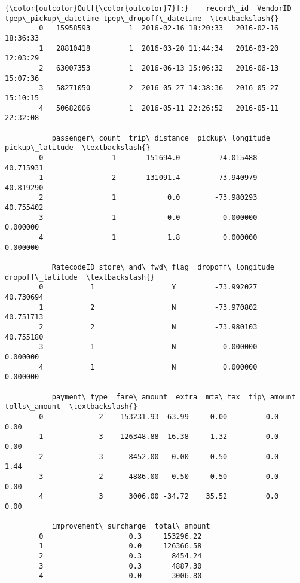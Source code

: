 \documentclass[11pt]{article}
\begin{document}
\begin{Verbatim}[commandchars=\\\{\}]
{\color{outcolor}Out[{\color{outcolor}7}]:}    record\_id  VendorID tpep\_pickup\_datetime tpep\_dropoff\_datetime  \textbackslash{}
        0   15958593         1  2016-02-16 18:20:33   2016-02-16 18:36:33   
        1   28810418         1  2016-03-20 11:44:34   2016-03-20 12:03:29   
        2   63007353         1  2016-06-13 15:06:32   2016-06-13 15:07:36   
        3   58271050         2  2016-05-27 14:38:36   2016-05-27 15:10:15   
        4   50682006         1  2016-05-11 22:26:52   2016-05-11 22:32:08   
        
           passenger\_count  trip\_distance  pickup\_longitude  pickup\_latitude  \textbackslash{}
        0                1       151694.0        -74.015488        40.715931   
        1                2       131091.4        -73.940979        40.819290   
        2                1            0.0        -73.980293        40.755402   
        3                1            0.0          0.000000         0.000000   
        4                1            1.8          0.000000         0.000000   
        
           RatecodeID store\_and\_fwd\_flag  dropoff\_longitude  dropoff\_latitude  \textbackslash{}
        0           1                  Y         -73.992027         40.730694   
        1           2                  N         -73.970802         40.751713   
        2           2                  N         -73.980103         40.755180   
        3           1                  N           0.000000          0.000000   
        4           1                  N           0.000000          0.000000   
        
           payment\_type  fare\_amount  extra  mta\_tax  tip\_amount  tolls\_amount  \textbackslash{}
        0             2    153231.93  63.99     0.00         0.0          0.00   
        1             3    126348.88  16.38     1.32         0.0          0.00   
        2             3      8452.00   0.00     0.50         0.0          1.44   
        3             2      4886.00   0.50     0.50         0.0          0.00   
        4             3      3006.00 -34.72    35.52         0.0          0.00   
        
           improvement\_surcharge  total\_amount  
        0                    0.3     153296.22  
        1                    0.0     126366.58  
        2                    0.3       8454.24  
        3                    0.3       4887.30  
        4                    0.0       3006.80  
\end{Verbatim}
            
\end{document}
